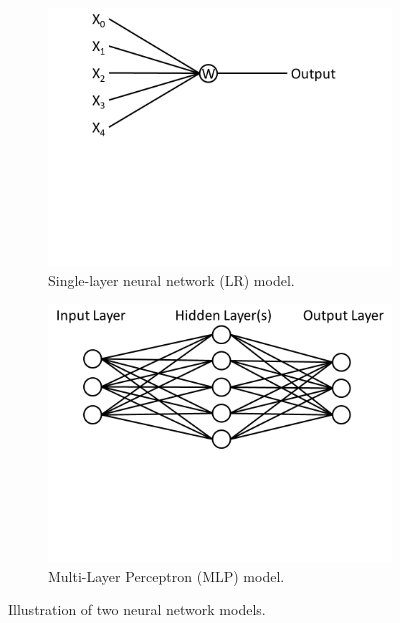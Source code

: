 \begin{figure}[!h]
\centering
\begin{subfigure}{.49\linewidth}
  \centering
  \includegraphics[trim=0 260 0 0,clip,width=\linewidth]{f-figs/lr-diag}
  \caption{Single-layer neural network (LR) model.}
  \label{fig:lr-diag}
\end{subfigure}
\begin{subfigure}{.5\linewidth}
  \centering
  \includegraphics[trim=0 230 0 0,clip,width=\linewidth]{f-figs/mlp-diag}
  \caption{Multi-Layer Perceptron (MLP) model.}
  \label{fig:mlp-diag}
\end{subfigure}
\caption{Illustration of two neural network models.}
\end{figure}

